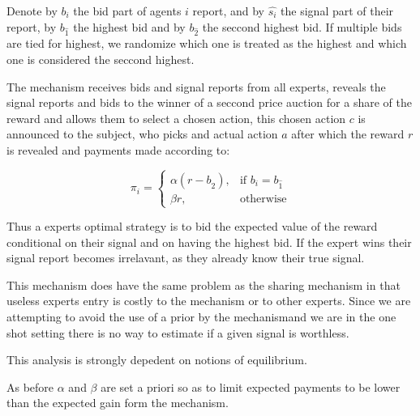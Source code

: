 Denote by $b_i$ the bid part of agents $i$ report, and by $\hat{s_i}$ the signal part of their report, by $b_{\hat{1}}$ the highest bid and by $b_{\hat{2}}$ the seccond highest bid. If multiple bids are tied for highest, we  randomize which one is treated as the highest and which one is considered the seccond highest.

\begin{mech}
The mechanism receives bids and signal reports from all experts, reveals the signal reports and bids to the winner of a seccond price auction for a share of the reward and allows them to select a chosen action, this chosen action $c$ is announced to the subject, who picks and actual action $a$ after which the reward $r$ is revealed and payments made according to:


\[
    \pi_i = 
\begin{cases}
    \alpha (r - b_{\hat{2}} ) ,& \text{if } b_i = b_{\hat{1}}\\
    \beta r,              & \text{otherwise}
\end{cases}
\]

\end{mech}

Thus a experts optimal strategy is to bid the expected value of the reward conditional on their signal and on having the highest bid. If the expert wins their signal report becomes irrelavant, as they already know their true signal. 

This mechanism does have the same problem as the sharing mechanism in that useless experts entry is costly to the mechanism or to other experts. Since we are attempting to avoid the use of a prior by the mechanismand we are in the one shot setting there is no way to estimate if a given signal is worthless. 



This analysis is strongly depedent on notions of equilibrium. 


As before $\alpha$ and $\beta$ are set a priori so as to limit expected payments to be lower than the expected gain form the mechanism. 

